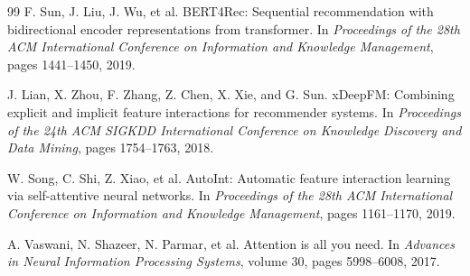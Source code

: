 \documentclass{article}
\begin{document}
\begin{thebibliography}{99}
F. Sun, J. Liu, J. Wu, et al.
\newblock BERT4Rec: Sequential recommendation with bidirectional encoder representations from transformer.
\newblock In \emph{Proceedings of the 28th ACM International Conference on Information and Knowledge Management}, pages 1441--1450, 2019.

J. Lian, X. Zhou, F. Zhang, Z. Chen, X. Xie, and G. Sun.
\newblock xDeepFM: Combining explicit and implicit feature interactions for recommender systems.
\newblock In \emph{Proceedings of the 24th ACM SIGKDD International Conference on Knowledge Discovery and Data Mining}, pages 1754--1763, 2018.

W. Song, C. Shi, Z. Xiao, et al.
\newblock AutoInt: Automatic feature interaction learning via self-attentive neural networks.
\newblock In \emph{Proceedings of the 28th ACM International Conference on Information and Knowledge Management}, pages 1161--1170, 2019.

A. Vaswani, N. Shazeer, N. Parmar, et al.
\newblock Attention is all you need.
\newblock In \emph{Advances in Neural Information Processing Systems}, volume 30, pages 5998--6008, 2017.

\end{thebibliography}
\end{document}
